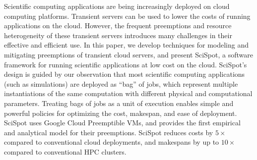 Scientific computing applications are being increasingly deployed on cloud computing platforms.
Transient servers can be used to lower the costs of running applications on the cloud.
However, the frequent preemptions and resource heterogeneity of these transient servers introduces many challenges in their effective and efficient use.
In this paper, we develop techniques for modeling and mitigating preemptions of transient cloud servers, and present SciSpot, a software framework for running scientific applications at low cost on the cloud.
SciSpot's design is guided by our observation that most  scientific computing applications (such as simulations) are deployed as ``bag'' of jobs, which represent multiple instantiations of the same computation with different physical and computational parameters.
Treating bags of jobs as a unit of execution enables simple and powerful policies for optimizing the cost, makespan, and ease of deployment. 
SciSpot uses Google Cloud Preemptible VMs, and provides the first empirical and analytical model for their preemptions. 
SciSpot reduces costs by $5\times$ compared to conventional cloud deployments, and makespans by up to $10\times$ compared to conventional HPC clusters.









